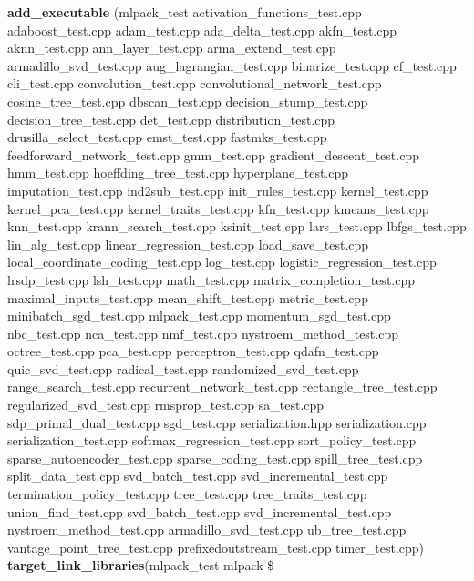 \begin{DoxyCompactItemize}
{\bf add\+\_\+executable} (mlpack\+\_\+test activation\+\_\+functions\+\_\+test.\+cpp adaboost\+\_\+test.\+cpp adam\+\_\+test.\+cpp ada\+\_\+delta\+\_\+test.\+cpp akfn\+\_\+test.\+cpp aknn\+\_\+test.\+cpp ann\+\_\+layer\+\_\+test.\+cpp arma\+\_\+extend\+\_\+test.\+cpp armadillo\+\_\+svd\+\_\+test.\+cpp aug\+\_\+lagrangian\+\_\+test.\+cpp binarize\+\_\+test.\+cpp cf\+\_\+test.\+cpp cli\+\_\+test.\+cpp convolution\+\_\+test.\+cpp convolutional\+\_\+network\+\_\+test.\+cpp cosine\+\_\+tree\+\_\+test.\+cpp dbscan\+\_\+test.\+cpp decision\+\_\+stump\+\_\+test.\+cpp decision\+\_\+tree\+\_\+test.\+cpp det\+\_\+test.\+cpp distribution\+\_\+test.\+cpp drusilla\+\_\+select\+\_\+test.\+cpp emst\+\_\+test.\+cpp fastmks\+\_\+test.\+cpp feedforward\+\_\+network\+\_\+test.\+cpp gmm\+\_\+test.\+cpp gradient\+\_\+descent\+\_\+test.\+cpp hmm\+\_\+test.\+cpp hoeffding\+\_\+tree\+\_\+test.\+cpp hyperplane\+\_\+test.\+cpp imputation\+\_\+test.\+cpp ind2sub\+\_\+test.\+cpp init\+\_\+rules\+\_\+test.\+cpp kernel\+\_\+test.\+cpp kernel\+\_\+pca\+\_\+test.\+cpp kernel\+\_\+traits\+\_\+test.\+cpp kfn\+\_\+test.\+cpp kmeans\+\_\+test.\+cpp knn\+\_\+test.\+cpp krann\+\_\+search\+\_\+test.\+cpp ksinit\+\_\+test.\+cpp lars\+\_\+test.\+cpp lbfgs\+\_\+test.\+cpp lin\+\_\+alg\+\_\+test.\+cpp linear\+\_\+regression\+\_\+test.\+cpp load\+\_\+save\+\_\+test.\+cpp local\+\_\+coordinate\+\_\+coding\+\_\+test.\+cpp log\+\_\+test.\+cpp logistic\+\_\+regression\+\_\+test.\+cpp lrsdp\+\_\+test.\+cpp lsh\+\_\+test.\+cpp math\+\_\+test.\+cpp matrix\+\_\+completion\+\_\+test.\+cpp maximal\+\_\+inputs\+\_\+test.\+cpp mean\+\_\+shift\+\_\+test.\+cpp metric\+\_\+test.\+cpp minibatch\+\_\+sgd\+\_\+test.\+cpp mlpack\+\_\+test.\+cpp momentum\+\_\+sgd\+\_\+test.\+cpp nbc\+\_\+test.\+cpp nca\+\_\+test.\+cpp nmf\+\_\+test.\+cpp nystroem\+\_\+method\+\_\+test.\+cpp octree\+\_\+test.\+cpp pca\+\_\+test.\+cpp perceptron\+\_\+test.\+cpp qdafn\+\_\+test.\+cpp quic\+\_\+svd\+\_\+test.\+cpp radical\+\_\+test.\+cpp randomized\+\_\+svd\+\_\+test.\+cpp range\+\_\+search\+\_\+test.\+cpp recurrent\+\_\+network\+\_\+test.\+cpp rectangle\+\_\+tree\+\_\+test.\+cpp regularized\+\_\+svd\+\_\+test.\+cpp rmsprop\+\_\+test.\+cpp sa\+\_\+test.\+cpp sdp\+\_\+primal\+\_\+dual\+\_\+test.\+cpp sgd\+\_\+test.\+cpp serialization.\+hpp serialization.\+cpp serialization\+\_\+test.\+cpp softmax\+\_\+regression\+\_\+test.\+cpp sort\+\_\+policy\+\_\+test.\+cpp sparse\+\_\+autoencoder\+\_\+test.\+cpp sparse\+\_\+coding\+\_\+test.\+cpp spill\+\_\+tree\+\_\+test.\+cpp split\+\_\+data\+\_\+test.\+cpp svd\+\_\+batch\+\_\+test.\+cpp svd\+\_\+incremental\+\_\+test.\+cpp termination\+\_\+policy\+\_\+test.\+cpp tree\+\_\+test.\+cpp tree\+\_\+traits\+\_\+test.\+cpp union\+\_\+find\+\_\+test.\+cpp svd\+\_\+batch\+\_\+test.\+cpp svd\+\_\+incremental\+\_\+test.\+cpp nystroem\+\_\+method\+\_\+test.\+cpp armadillo\+\_\+svd\+\_\+test.\+cpp ub\+\_\+tree\+\_\+test.\+cpp vantage\+\_\+point\+\_\+tree\+\_\+test.\+cpp prefixedoutstream\+\_\+test.\+cpp timer\+\_\+test.\+cpp) {\bf target\+\_\+link\+\_\+libraries}(mlpack\+\_\+test mlpack \$
\end{DoxyCompactItemize}


